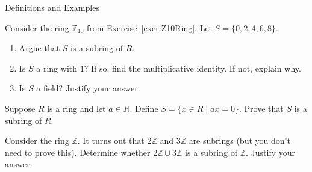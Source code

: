 \begin{section}{Definitions and Examples}
\begin{problem}
Consider the ring $\mathbb{Z}_{10}$ from Exercise~\ref{exer:Z10Ring}. Let $S=\{0,2,4,6,8\}$.
\begin{enumerate}[label=\rm{(\alph*)}]
\item Argue that $S$ is a subring of $R$.
\item Is $S$ a ring with 1?  If so, find the multiplicative identity.  If not, explain why.
\item Is $S$ a field? Justify your answer.
\end{enumerate}
\end{problem}

\begin{problem}
Suppose $R$ is a ring and let $a\in R$.  Define $S=\{x\in R\mid ax=0\}$.  Prove that $S$ is a subring of $R$.
\end{problem}

\begin{problem}
Consider the ring $\mathbb{Z}$.  It turns out that $2\mathbb{Z}$ and $3\mathbb{Z}$ are subrings (but you don't need to prove this).  Determine whether $2\mathbb{Z}\cup 3\mathbb{Z}$ is a subring of $\mathbb{Z}$.  Justify your answer.
\end{problem}

\end{section}

